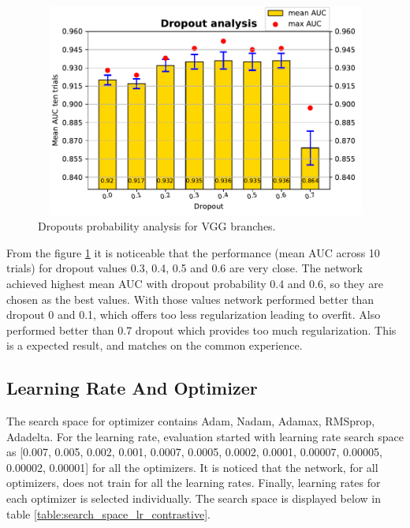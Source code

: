 \begin{figure}[ht]
\centering
\includegraphics[width= 12cm,height= 7cm]{images/contrastive/contrastive_loss_dropout_bar}
\caption{Dropouts probability analysis for VGG branches.}
\label{fig:contrastive_loss_dropout_bar}
\end{figure}

From the figure \ref{fig:contrastive_loss_dropout_bar} it is noticeable that the performance (mean AUC across 10 trials) for dropout values 0.3, 0.4, 0.5 and 0.6 are very close. 
The network achieved highest mean AUC with dropout probability 0.4 and 0.6, so they are chosen as the best values. With those values network performed better than dropout 0 and 0.1, which offers too less regularization leading to overfit. 
Also performed better than 0.7 dropout which provides too much regularization. This is a expected result, and matches on the common experience.

\subsection{Learning Rate And Optimizer}
The search space for optimizer contains Adam, Nadam, Adamax, RMSprop, Adadelta. For the learning rate, evaluation started with learning rate search space as [0.007, 0.005, 0.002, 0.001, 0.0007, 0.0005, 0.0002, 0.0001, 0.00007, 0.00005, 0.00002, 0.00001]
for all the optimizers. It is noticed that the network, for all optimizers, does not train for all the learning rates. Finally, learning rates for each optimizer is selected individually. The search space is displayed below in table 
\ref{table:search_space_lr_contrastive}.

